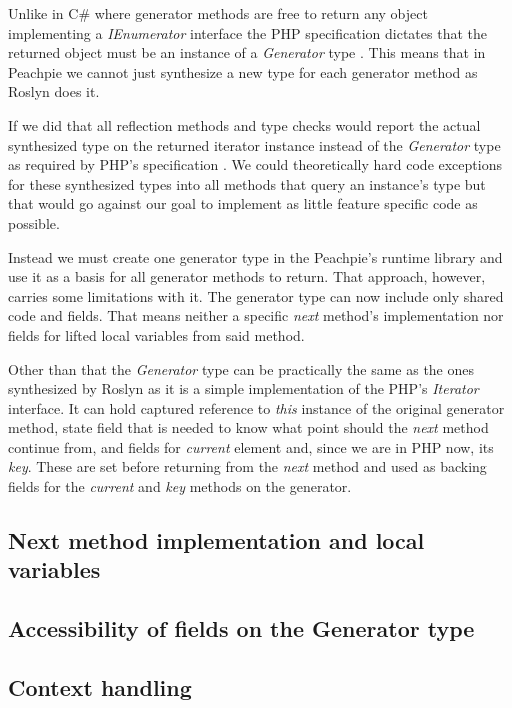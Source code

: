 Unlike in C\# where generator methods are free to return any object implementing a \emph{IEnumerator} interface the PHP specification dictates that the returned object must be an instance of a \emph{Generator} type \citep{GenPHP, GenPHPRFC}. This means that in Peachpie we cannot just synthesize a new type for each generator method as Roslyn does it.

If we did that all reflection methods and type checks would report the actual synthesized type on the returned iterator instance instead of the \emph{Generator} type as required by PHP’s specification . We could theoretically hard code exceptions for these synthesized types into all methods that query an instance’s type but that would go against our goal to implement as little feature specific code as possible.

Instead we must create one generator type in the Peachpie’s runtime library and use it as a basis for all generator methods to return. That approach, however, carries some limitations with it. The generator type can now include only shared code and fields. That means neither a specific \emph{next} method’s implementation nor fields for lifted local variables from said method.

Other than that the \emph{Generator} type can be practically the same as the ones synthesized by Roslyn as it is a simple implementation of the PHP's \emph{Iterator} interface. It can hold captured reference to \emph{this} instance of the original generator method, state field that is needed to know what point should the \emph{next} method continue from, and fields for \emph{current} element and, since we are in PHP now, its \emph{key}. These are set before returning from the \emph{next} method and used as backing fields for the \emph{current} and \emph{key} methods on the generator.


\subsection{Next method implementation and local variables}

\subsection{Accessibility of fields on the Generator type}

\subsection{Context handling}

